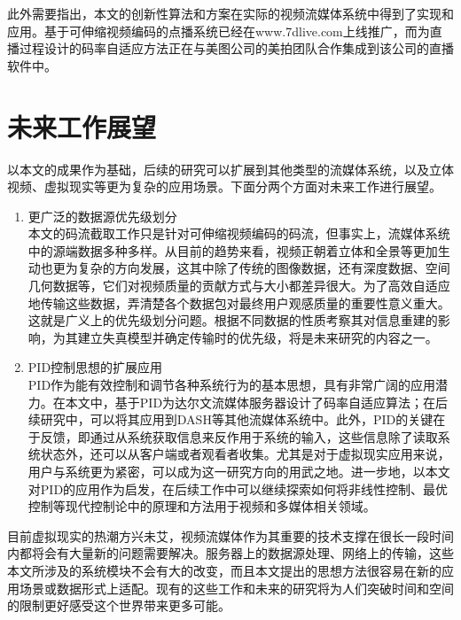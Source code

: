此外需要指出，本文的创新性算法和方案在实际的视频流媒体系统中得到了实现和应用。基于可伸缩视频编码的点播系统已经在www.7dlive.com上线推广，而为直播过程设计的码率自适应方法正在与美图公司的美拍团队合作集成到该公司的直播软件中。

\section{未来工作展望}

以本文的成果作为基础，后续的研究可以扩展到其他类型的流媒体系统，以及立体视频、虚拟现实等更为复杂的应用场景。下面分两个方面对未来工作进行展望。
\begin{enumerate}
\item {更广泛的数据源优先级划分} \\
本文的码流截取工作只是针对可伸缩视频编码的码流，但事实上，流媒体系统中的源端数据多种多样。从目前的趋势来看，视频正朝着立体和全景等更加生动也更为复杂的方向发展，这其中除了传统的图像数据，还有深度数据、空间几何数据等，它们对视频质量的贡献方式与大小都差异很大。为了高效自适应地传输这些数据，弄清楚各个数据包对最终用户观感质量的重要性意义重大。这就是广义上的优先级划分问题。根据不同数据的性质考察其对信息重建的影响，为其建立失真模型并确定传输时的优先级，将是未来研究的内容之一。
\item {PID控制思想的扩展应用} \\
PID作为能有效控制和调节各种系统行为的基本思想，具有非常广阔的应用潜力。在本文中，基于PID为达尔文流媒体服务器设计了码率自适应算法；在后续研究中，可以将其应用到DASH等其他流媒体系统中。此外，PID的关键在于反馈，即通过从系统获取信息来反作用于系统的输入，这些信息除了读取系统状态外，还可以从客户端或者观看者收集。尤其是对于虚拟现实应用来说，用户与系统更为紧密，可以成为这一研究方向的用武之地。进一步地，以本文对PID的应用作为启发，在后续工作中可以继续探索如何将非线性控制、最优控制等现代控制论中的原理和方法用于视频和多媒体相关领域。
\end{enumerate}

目前虚拟现实的热潮方兴未艾，视频流媒体作为其重要的技术支撑在很长一段时间内都将会有大量新的问题需要解决。服务器上的数据源处理、网络上的传输，这些本文所涉及的系统模块不会有大的改变，而且本文提出的思想方法很容易在新的应用场景或数据形式上适配。现有的这些工作和未来的研究将为人们突破时间和空间的限制更好感受这个世界带来更多可能。